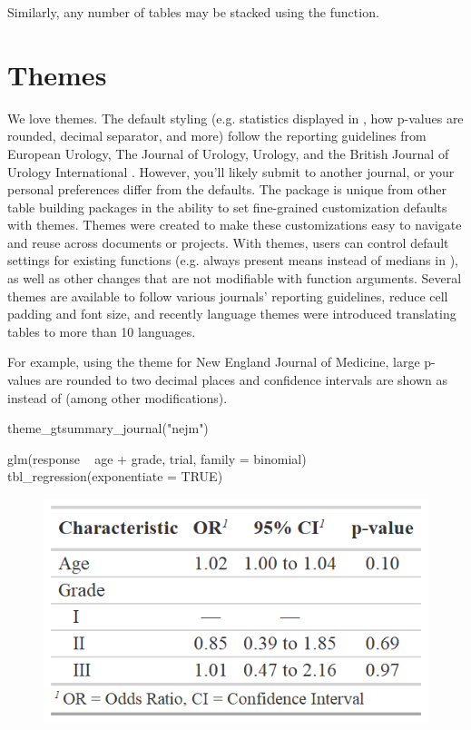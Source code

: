 Similarly, any number of  tables may be stacked using the  function.

\section{Themes}

We love themes.
The default styling (e.g. statistics displayed in , how p-values are rounded, decimal separator, and more) follow the reporting guidelines from European Urology, The Journal of Urology, Urology, and the British Journal of Urology International \citep{assel2019guidelines}.
However, you'll likely submit to another journal, or your personal preferences differ from the defaults.
The  package is unique from other table building packages in the ability to set fine-grained customization defaults with themes. 
Themes were created to make these customizations easy to navigate and reuse across documents or projects. 
With themes, users can control default settings for existing functions (e.g. always present means instead of medians in ), as well as other changes that are not modifiable with function arguments.
Several themes are available to follow various journals' reporting guidelines, reduce cell padding and font size, and recently language themes were introduced translating  tables to more than 10 languages.

For example, using the theme for New England Journal of Medicine, large p-values are rounded to two decimal places and confidence intervals are shown as  instead of  (among other modifications). 

\begin{example}
theme_gtsummary_journal("nejm")

glm(response ~ age + grade, trial, family = binomial) %
  tbl_regression(exponentiate = TRUE)
\end{example}

\begin{figure}[h!]
  \includegraphics[scale=0.49]{nejm.png}
  \centering
\end{figure}

